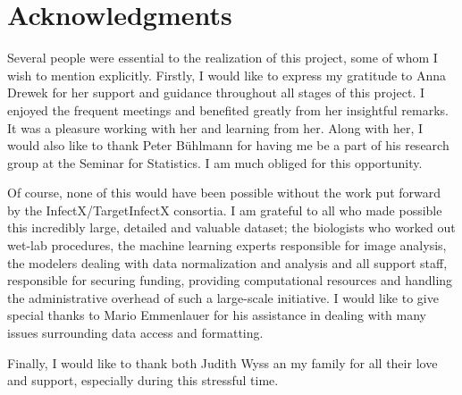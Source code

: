 \section*{Acknowledgments}

Several people were essential to the realization of this project, some of whom I wish to mention explicitly. Firstly, I would like to express my gratitude to Anna Drewek for her support and guidance throughout all stages of this project. I enjoyed the frequent meetings and benefited greatly from her insightful remarks. It was a pleasure working with her and learning from her. Along with her, I would also like to thank Peter B\"uhlmann for having me be a part of his research group at the Seminar for Statistics. I am much obliged for this opportunity.

Of course, none of this would have been possible without the work put forward by the InfectX/TargetInfectX consortia. I am grateful to all who made possible this incredibly large, detailed and valuable dataset; the biologists who worked out wet-lab procedures, the machine learning experts responsible for image analysis, the modelers dealing with data normalization and analysis and all support staff, responsible for securing funding, providing computational resources and handling the administrative overhead of such a large-scale initiative. I would like to give special thanks to Mario Emmenlauer for his assistance in dealing with many issues surrounding data access and formatting.

Finally, I would like to thank both Judith Wyss an my family for all their love and support, especially during this stressful time.
